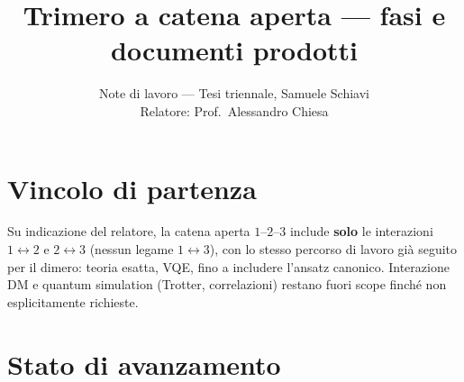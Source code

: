 \documentclass[11pt,a4paper]{article}
\title{Trimero a catena aperta — fasi e documenti prodotti}
\author{Note di lavoro — Tesi triennale, Samuele Schiavi\\ Relatore: Prof.\ Alessandro Chiesa}
\date{}
\begin{document}
\maketitle

\section{Vincolo di partenza}

Su indicazione del relatore, la catena aperta $1$--$2$--$3$ include \textbf{solo}
le interazioni $1\leftrightarrow2$ e $2\leftrightarrow3$ (nessun legame
$1\leftrightarrow3$), con lo stesso percorso di lavoro già seguito per il
dimero: teoria esatta, VQE, fino a includere l'ansatz canonico. Interazione
DM e quantum simulation (Trotter, correlazioni) restano fuori scope finché
non esplicitamente richieste.

\section{Stato di avanzamento}
\end{document}
